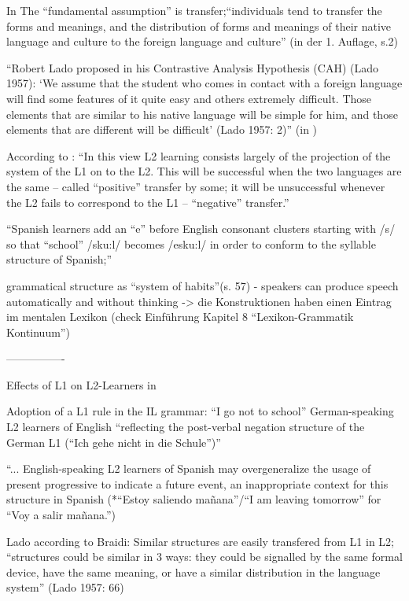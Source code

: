 In \cite{Lado71} The ``fundamental assumption'' is transfer;``individuals tend to transfer the forms and meanings, and the distribution of forms and meanings of their native language and culture to the foreign language and culture'' (in der 1. Auflage, s.2)

``Robert Lado proposed in his
Contrastive Analysis Hypothesis (CAH) (Lado 1957): ‘We assume that the
student who comes in contact with a foreign language will find some features
of it quite easy and others extremely difficult. Those elements that are similar
to his native language will be simple for him, and those elements that
are different will be difficult’ (Lado 1957: 2)'' (in \cite{Ellis06})


According to \cite{Cook93}: ``In this view L2 learning consists largely of the projection of the system of the L1 on to the L2.
This will be successful when the two languages are the same -- called ``positive'' transfer by some;
it will be unsuccessful whenever the L2 fails to correspond to the L1 -- ``negative'' transfer.''

``Spanish learners add an ``e'' before English consonant clusters starting with /s/ so that ``school'' /sku:l/ becomes /esku:l/ in order to conform to the syllable structure of Spanish;''

grammatical structure as ``system of habits''(s. 57) - speakers can produce speech automatically and without thinking -> die Konstruktionen haben einen Eintrag im mentalen Lexikon (check Einführung \cite{Ziem13} Kapitel 8 ``Lexikon-Grammatik Kontinuum'')

----------------

Effects of L1 on L2-Learners in \cite{Braidi99}


Adoption of a L1 rule in the IL grammar:
``I go not to school'' German-speaking L2 learners of English ``reflecting the post-verbal negation structure
of the German L1 (``Ich gehe nicht in die Schule'')''

``... English-speaking L2 learners of Spanish may overgeneralize the usage of present progressive to indicate a
future event, an inappropriate context for this structure in Spanish (*``Estoy saliendo mañana''/``I am leaving tomorrow''
for ``Voy a salir mañana.'')


Lado according to Braidi:
Similar structures are easily transfered from L1 in L2;
``structures could be similar in 3 ways: they could be signalled by the same formal device, have the same meaning,
or have a similar distribution in the language system'' (Lado 1957: 66)

